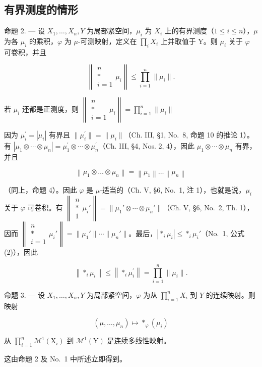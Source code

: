 \subsection{有界测度的情形}

命题 2. --- 设 \(X_{1},\ldots,X_{n},Y\) 为局部紧空间，\(\mu_{i}\) 为 \(X_{i}\) 上的有界测度（\(1\leqslant i\leqslant n\)），\(\mu\) 为各 \(\mu_{i}\) 的乘积，\(\varphi\) 为 \(\mu\)-可测映射，定义在 \(\prod_{i}X_{i}\) 上并取值于 Y。则 \(\mu_{i}\) 关于 \(\varphi\) 可卷积，并且

\[
\left\| \begin{array}{c} n \\ * \\ i = 1 \end{array} \mu_ {i} \right\| \leqslant \prod_ {i = 1} ^ {n} \| \mu_ {i} \|.
\]

若 \(\mu_{i}\) 还都是正测度，则 \(\left\| \begin{array}{c}n\\ *\\ i = 1 \end{array} \mu_i\right\| = \prod_{i = 1}^{n}\| \mu_{i}\|\)

因为 \(\mu_{i}^{\prime}=|\mu_{i}|\) 有界且 \(\|\mu_{i}^{\prime}\|=\|\mu_{i}\|\)（Ch. III, §1, No.~8, 命题 10 的推论 1）。有 \(|\mu_{1}\otimes\cdots\otimes\mu_{n}|=\mu_{1}^{\prime}\otimes\cdots\otimes\mu_{n}^{\prime}\)（Ch. III, §4, Nos. 2, 4），因此 \(\mu_{1}\otimes\cdots\otimes\mu_{n}\) 有界，并且

\[
\left\| \mu_ {1} \otimes \dots \otimes \mu_ {n} \right\| = \left\| \mu_ {1} \right\| \dots \left\| \mu_ {n} \right\|
\]

（同上，命题 4）。因此 \(\varphi\) 是 \(\mu\)-适当的（Ch. V, §6, No.~1, 注 1），也就是说，\(\mu_i\) 关于 \(\varphi\) 可卷积。有 \(\left\| \begin{array}{c} n \\ * \\ 1 \end{array} \mu_i'\right\| = \| \mu_1' \otimes \cdots \otimes \mu_n'\|\)（Ch. V, §6, No.~2, Th. 1），因而 \(\left\| \begin{array}{c} n \\ * \\ i=1 \end{array} \mu_i'\right\| = \| \mu_1'\| \cdots \| \mu_n'\|\)。最后，\(| *_{i} \mu_i| \leqslant *_{i} \mu_i'\)（No.~1, 公式 (2)），因此

\[
\left\| \ast_ {i} \mu_ {i} \right\| \leqslant \left\| \ast_ {i} \mu_ {i} ^ {\prime} \right\| = \prod_ {i = 1} ^ {n} \| \mu_ {i} \|.
\]

命题 3. --- 设 \(X_1, \ldots, X_n, Y\) 为局部紧空间，\(\varphi\) 为从 \(\prod_{i=1}^{n} X_i\) 到 \(Y\) 的连续映射。则映射

\[
(\mu , \dots , \mu_ {n}) \mapsto * _ {\varphi} (\mu_ {i})
\]

从 \(\prod_{i=1}^{n} \mathcal{M}^1(\mathrm{X}_i)\) 到 \(\mathcal{M}^1(\mathrm{Y})\) 是连续多线性映射。

这由命题 2 及 No.~1 中所述立即得到。

